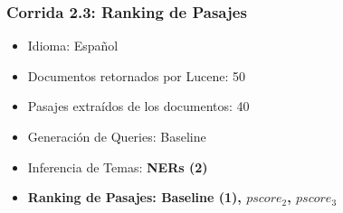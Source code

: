 \begin{frame}
\frametitle{Corrida 2.3: Ranking de Pasajes}

\begin{itemize}
  \item Idioma: Español
  \item Documentos retornados por Lucene: 50
  \item Pasajes extraídos de los documentos: 40
  \item Generación de Queries: Baseline
  \item Inferencia de Temas: \textbf{NERs (2)}
  \item \textbf{{\color{blue}Ranking de Pasajes:  Baseline (1), $pscore_2$, $pscore_3$}}
\end{itemize}
\end{frame}

